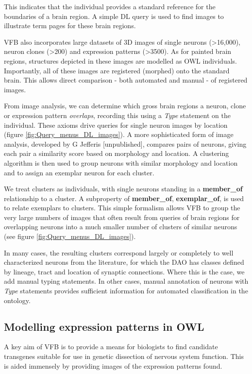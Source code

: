 \documentclass[runningheads,a4paper]{llncs}
\begin{document}
This indicates that the individual provides a standard reference for
the boundaries of a brain region.  A simple DL query is used to find
images to illustrate term pages for these brain regions.

VFB also incorporates large datasets of 3D images of single neurons
(\textgreater 16,000), neuron clones (\textgreater 200) and expression
patterns (\textgreater 3500). As for painted brain regions, structures
depicted in these images are modelled as OWL individuals.
Importantly, all of these images are registered (morphed) onto the
standard brain. This allows direct comparison - both automated and
manual  - of registered images.

From image analysis, we can determine which gross brain regions a
neuron, clone or expression pattern \textit{overlaps}, recording this
using a \textit{Type} statement on the individual.  These axioms drive queries for
single neuron images by location (figure
\ref{fig:Query_menus_DL_images}). A more sophisticated form of image
analysis, developed by G Jefferis [unpublished], compares pairs of
neurons,  giving each pair a similarity score based on morphology
and location.  A clustering algorithm is then used to group neurons with
similar morphology and location and to assign an exemplar neuron for
each cluster.

We treat clusters as individuals, with single neurons standing in a
\textbf{member\_of} relationship to a cluster.  A subproperty of
\textbf{member\_of}, \textbf{exemplar\_of}, is used to relate
exemplars to clusters.  This simple formalism allows VFB to group the
very large numbers of images that often result from queries of brain
regions for overlapping neurons into a much smaller number of clusters
of similar neurons (see figure \ref{fig:Query_menus_DL_images}).

In many cases, the resulting clusters correspond largely or completely
to well characterized neurons from the literature, for which the DAO
has classes defined by lineage, tract and location of synaptic
connections. Where this is the case, we add manual typing
statements. In other cases, manual annotation of neurons with
\textit{Type} statements provides sufficient information for automated
classification in the ontology.

\subsection{Modelling expression patterns in OWL}

A key aim of VFB is to provide a means for biologists to find
candidate transgenes suitable for use in genetic dissection of nervous
system function. This is aided immensely by providing images of the
expression patterns found.
\end{document}
